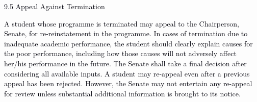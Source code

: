 \documentclass[12pt]{article}
\begin{document}
\vspace{\baselineskip}
\begin{adjustwidth}{0.07in}{0.0in}
\textcolor[HTML]{00000A}{9.5 Appeal Against Termination}\par

\end{adjustwidth}


\vspace{\baselineskip}
\begin{adjustwidth}{0.07in}{0.0in}
\begin{justify}
{\fontsize{10pt}{12.0pt}\selectfont \textcolor[HTML]{00000A}{A student whose programme is terminated may appeal to the Chairperson, Senate, for re-reinstatement in the programme. In cases of termination due to inadequate academic performance, the student should clearly explain causes for the poor performance, including how those causes will not adversely affect her/his performance in the future. The Senate shall take a final decision after considering all available inputs. A student may re-appeal even after a previous appeal has been rejected. However, the Senate may not entertain any re-appeal for review unless substantial additional information is brought to its notice.}\par}
\end{justify}\par

\end{adjustwidth}


\vspace{\baselineskip}

\vspace{\baselineskip}

\vspace{\baselineskip}

\vspace{\baselineskip}

\vspace{\baselineskip}

\vspace{\baselineskip}

\vspace{\baselineskip}

\vspace{\baselineskip}

\vspace{\baselineskip}

\vspace{\baselineskip}

\vspace{\baselineskip}
\end{document}

